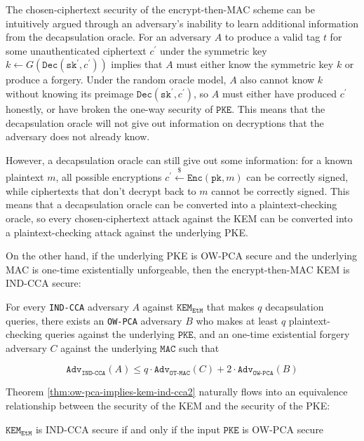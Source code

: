 \documentclass[journal=tches,submission]{iacrtrans}
\newcommand{\pke}{\texttt{PKE}}
\newcommand{\encrypt}{\texttt{Enc}}
\newcommand{\decrypt}{\texttt{Dec}}
\newcommand{\kem}{\texttt{KEM}}
\newcommand{\etm}{\texttt{EtM}}  %
\newcommand{\mac}{\texttt{MAC}}
\newcommand{\pk}{\texttt{pk}}
\newcommand{\sk}{\texttt{sk}}
\newcommand{\leftsample}{\stackrel{\$}{\leftarrow}}
\newcommand{\adv}{\texttt{Adv}}
\begin{document}
The chosen-ciphertext security of the encrypt-then-MAC scheme can be intuitively argued through an adversary's inability to learn additional information from the decapsulation oracle. For an adversary $A$ to produce a valid tag $t$ for some unauthenticated ciphertext $c^\prime$ under the symmetric key $k \leftarrow G(\decrypt(\sk^\prime, c^\prime))$ implies that $A$ must either know the symmetric key $k$ or produce a forgery. Under the random oracle model, $A$ also cannot know $k$ without knowing its preimage $\decrypt(\sk^\prime, c^\prime)$, so $A$ must either have produced $c^\prime$ honestly, or have broken the one-way security of $\pke$. This means that the decapsulation oracle will not give out information on decryptions that the adversary does not already know. 

However, a decapsulation oracle can still give out some information: for a known plaintext $m$, all possible encryptions $c^\prime \leftsample \encrypt(\pk, m)$ can be correctly signed, while ciphertexts that don't decrypt back to $m$ cannot be correctly signed. This means that a decapsulation oracle can be converted into a plaintext-checking oracle, so every chosen-ciphertext attack against the KEM can be converted into a plaintext-checking attack against the underlying PKE.

On the other hand, if the underlying PKE is OW-PCA secure and the underlying MAC is one-time existentially unforgeable, then the encrypt-then-MAC KEM is IND-CCA secure:

\begin{theorem}\label{thm:ow-pca-implies-kem-ind-cca2}
    For every \texttt{IND-CCA} adversary $A$ against $\kem_\etm$ that makes $q$ decapsulation queries, there exists an \texttt{OW-PCA} adversary $B$ who makes at least $q$ plaintext-checking queries against the underlying $\pke$, and an one-time existential forgery adversary $C$ against the underlying $\mac$ such that

    \begin{equation*}
        \texttt{Adv}_\texttt{IND-CCA}(A) \leq q \cdot \adv_\texttt{OT-MAC}(C) + 2 \cdot \texttt{Adv}_\texttt{OW-PCA}(B)
    \end{equation*}
\end{theorem}

Theorem \ref{thm:ow-pca-implies-kem-ind-cca2} naturally flows into an equivalence relationship between the security of the KEM and the security of the PKE:

\begin{lemma}
    $\kem_\etm$ is IND-CCA secure if and only if the input $\pke$ is OW-PCA secure
\end{lemma}
\end{document}
